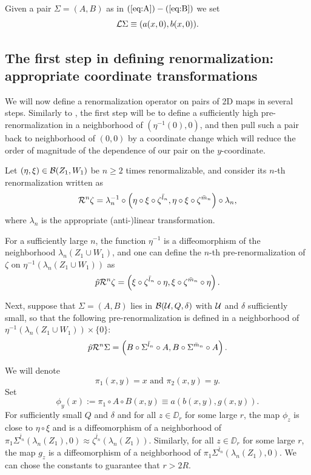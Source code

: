 Given a pair $\Sigma=(A,B)$ as in $(\ref{eq:A})-(\ref{eq:B})$ we set 
$$\mathcal{L} \Sigma \equiv (a(x,0),b(x,0)).$$


\subsection{The first step in defining renormalization: appropriate coordinate transformations}\label{transformations}
We will now define a renormalization operator on pairs of 2D maps in several steps. Similarly to \cite{CLM}, the first 
step will be to define  a sufficiently high pre-renormalization in a neighborhood of $(\eta^{-1}(0),0)$, and then pull such a 
pair back to neighborhood of $(0,0)$ by a coordinate change which will reduce the order of magnitude of the
 dependence of our pair on the $y$-coordinate. 


Let $(\eta,\xi) \in \mathcal{B}(Z_1,W_1)$ be $n\geq 2$ times renormalizable,  and consider its $n$-th renormalization written as
$$\mathcal{R}^n\zeta=\lambda_n^{-1}\circ \left(\eta \circ \xi \circ \zeta^{\bar l_n}, \eta \circ \xi \circ \zeta^{\bar m_n } \right) \circ \lambda_n,$$
where $\lambda_n$ is the appropriate (anti-)linear transformation. 

 For a  sufficiently large $n$, the function $\eta^{-1}$ is a diffeomorphism of the neighborhood $\lambda_n (Z_1 \cup W_1)$, and one can define the $n$-th pre-renormalization of $\zeta$ on $\eta^{-1}(\lambda_n (Z_1 \cup W_1))$ as 
$$\hat p \mathcal{R}^n\zeta=\left(\xi \circ \zeta^{\bar l_n} \circ \eta, \xi \circ \zeta^{\bar m_n } \circ \eta \right).$$

Next, suppose that $\Sigma=(A,B)$ lies in $\mathcal{B}(\mathcal{U},Q,\delta)$ with $\mathcal{U}$ and $\delta$ sufficiently small, so that 
the following pre-renormalization  is defined in a neighborhood of $\eta^{-1}(\lambda_n (Z_1 \cup W_1))\times \{ 0\}$:
$$\hat p \mathcal{R}^n \Sigma = \left(B \circ \Sigma^{\bar l_n} \circ A, B \circ \Sigma^{\bar m_n} \circ A \right).$$

We will denote $$\pi_1(x,y)=x\text{ and }\pi_2(x,y)=y.$$
Set
$$\phi_y(x) := \pi_1 \circ A \circ B(x,y) \equiv a(b(x,y),g(x,y)).$$
For sufficiently small $Q$ and $\delta$ and for all  $z \in \DD_r$ for some large $r$, the map $\phi_z$ is close to $\eta \circ \xi$ and is a diffeomorphism of a neighborhood of $\pi_1 \Sigma^{\bar l_n}(\lambda_n (Z_1),0) \approx \zeta^{\bar l_n}(\lambda_n (Z_1))$.  Similarly,  for all $z \in \DD_r$ for some large $r$, the map $g_z$ is a diffeomorphism of  a neighborhood of $\pi_1  \Sigma^{\bar l_n}(\lambda_n (Z_1),0)$. We can chose the constants to guarantee that $r>2R$.



